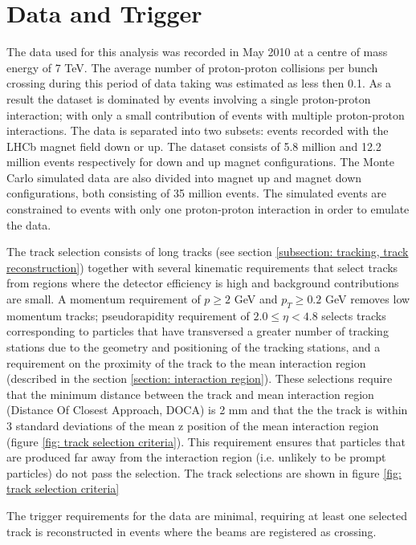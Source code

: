 \section{Data and Trigger}

The data used for this analysis was recorded in May 2010 at a centre of mass energy of 7 TeV. The average number of proton-proton collisions per bunch crossing during this period of data taking was estimated as less then 0.1. As a result the dataset is dominated by events involving a single proton-proton interaction; with only a small contribution of events with multiple proton-proton interactions. The data is separated into two subsets:  events recorded with the LHCb magnet field down or up. The dataset consists of 5.8 million and 12.2 million events respectively for down and up magnet configurations. The Monte Carlo simulated data are also divided into magnet up and magnet down configurations, both consisting of 35 million events. The simulated events are constrained to events with only one proton-proton interaction in order to emulate the data.

The track selection consists of long tracks (see section \ref{subsection: tracking, track reconstruction}) together with several kinematic requirements that select tracks from regions where the detector efficiency is high and background contributions are small. A momentum requirement of $p \ge 2$ GeV and $p_T \ge 0.2$ GeV removes low momentum tracks; pseudorapidity requirement of $2.0 \le \eta < 4.8$ selects tracks corresponding to particles that have transversed a greater number of tracking stations due to the geometry and positioning of the tracking stations, and a requirement on the proximity of the track to the mean interaction region (described in the section \ref{section: interaction region}). These selections require that the minimum distance between the track and mean interaction region (Distance Of Closest Approach, DOCA) is 2 mm and that the the track is within 3 standard deviations of the mean z position of the mean interaction region (figure \ref{fig: track selection criteria}). This requirement ensures that particles that are produced far away from the interaction region (i.e. unlikely to be prompt particles) do not pass the selection. The track selections are shown in figure \ref{fig: track selection criteria}

The trigger requirements for the data are minimal, requiring at least one selected track is reconstructed in events where the beams are registered as crossing.

